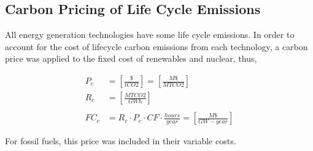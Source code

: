 \subsection{Carbon Pricing of Life Cycle Emissions}
All energy generation technologies have some life cycle emissions.
In order to account for the cost of lifecycle carbon emissions from each 
technology, a carbon price was applied to the fixed cost of renewables and 
nuclear, thus,

\begin{align}
P_c &= \left[\frac{\$}{tCO2}\right] = \left[\frac{M\$}{MTCO2}\right]\\
R_c &= \left[\frac{MTCO2}{GWh}\right]\\\\
FC_c &= R_c\cdot P_c \cdot CF \cdot \frac{hours}{year} = \left[\frac{M\$}{GW-year}\right]
\end{align}

For fossil fuels, this price was included in their variable costs.

